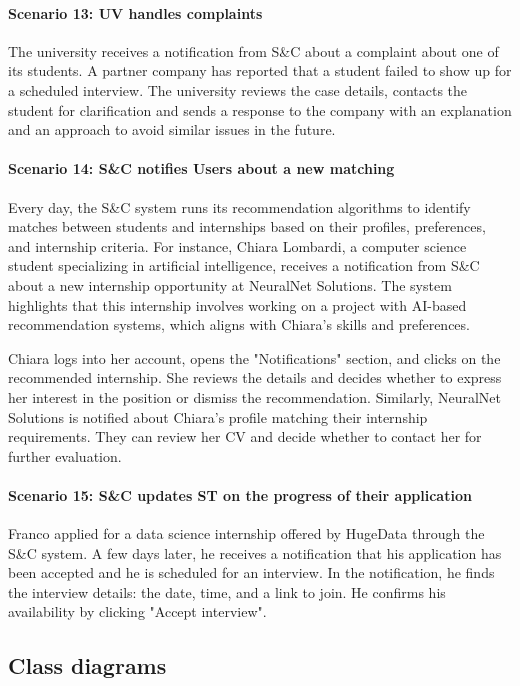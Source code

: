 \paragraph{Scenario 13: UV handles complaints}
The university receives a notification from S\&C about a complaint about one of its students. A partner company has reported that a student failed to show up for a scheduled interview. The university reviews the case details, contacts the student for clarification and sends a response to the company with an explanation and an approach to avoid similar issues in the future.

\paragraph{Scenario 14: S\&C notifies Users about a new matching}
Every day, the S\&C system runs its recommendation algorithms to identify matches between students and internships based on their profiles, preferences, and internship criteria. For instance, Chiara Lombardi, a computer science student specializing in artificial intelligence, receives a notification from S\&C about a new internship opportunity at NeuralNet Solutions. The system highlights that this internship involves working on a project with AI-based recommendation systems, which aligns with Chiara's skills and preferences.

Chiara logs into her account, opens the "Notifications" section, and clicks on the recommended internship. She reviews the details and decides whether to express her interest in the position or dismiss the recommendation. Similarly, NeuralNet Solutions is notified about Chiara's profile matching their internship requirements. They can review her CV and decide whether to contact her for further evaluation.

\paragraph{Scenario 15: S\&C updates ST on the progress of their application}
Franco applied for a data science internship offered by HugeData through the S\&C system. A few days later, he receives a notification that his application has been accepted and he is scheduled for an interview. In the notification, he finds the interview details: the date, time, and a link to join. He confirms his availability by clicking "Accept interview".

\subsection{Class diagrams}
\label{subsec:class_diagrams}%

